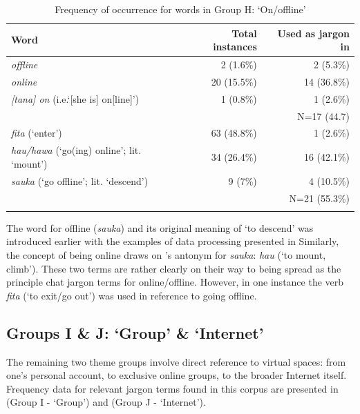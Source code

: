 \documentclass[output=paper,newtxmath,modfonts,nonflat,hidelinks]{langsci/langscibook}
\begin{document}
\begin{table}
\begin{tabularx}{\textwidth}{Qrr}
\lsptoprule
Word & Total instances & Used as jargon in \\
\midrule
\textit{offline}                             & 2 (1.6\%) & 2 (5.3\%)\\
\textit{online}                              & 20 (15.5\%) & 14 (36.8\%)\\
\textit{[tana] on} (i.e.‘[she is] on[line]’) & 1 (0.8\%) & 1 (2.6\%)\\\midrule
& & N=17 (44.7)\\\midrule
\textit{fita} (‘enter’)                            & 63 (48.8\%) & 1 (2.6\%)\\
\textit{hau/hawa} (‘go(ing) online’; lit. ‘mount’) & 34 (26.4\%) & 16 (42.1\%)\\
\textit{sauka} (‘go offline’; lit. ‘descend’)      & 9 (7\%) & 4 (10.5\%)\\\midrule
& & N=21 (55.3\%)\\
\lspbottomrule
\end{tabularx}
\caption{Frequency of occurrence for words in Group H: ‘On/offline’}
\label{tab:purvis:10}
\end{table} 

The word for offline (\textit{sauka}) and its original meaning of ‘to descend’ was introduced earlier with the examples of data processing presented in  Similarly, the concept of being online draws on ’s antonym for \textit{sauka}: \textit{hau} (‘to mount, climb’). These two terms are rather clearly on their way to being spread as the principle  chat jargon terms for online/offline. However, in one instance the verb \textit{fita} (‘to exit/go out’) was used in reference to going offline.

\subsection{Groups I \& J: ‘Group’ \& ‘Internet’}

The remaining two theme groups involve direct reference to virtual spaces: from one’s personal account, to exclusive online groups, to the broader Internet itself. Frequency data for relevant jargon terms found in this corpus are presented in  (Group I - ‘Group’) and  (Group J - ‘Internet’).
\end{document}
